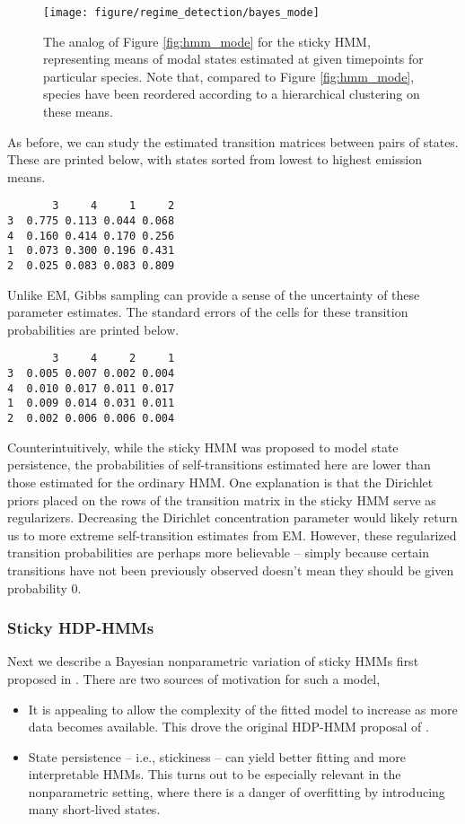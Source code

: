 \begin{figure}
  \centering
  \texttt{[image: figure/regime\_detection/bayes\_mode]}
  \caption{The analog of Figure \ref{fig:hmm_mode} for the sticky HMM,
    representing means of modal states estimated at given timepoints for
    particular species. Note that, compared to Figure \ref{fig:hmm_mode},
    species have been reordered according to a hierarchical clustering on these
    means. \label{fig:bayes_mode} }
\end{figure}

As before, we can study the estimated transition matrices between pairs of
states. These are printed below, with states sorted from lowest to highest
emission means.
\begin{verbatim}
       3     4     1     2
3  0.775 0.113 0.044 0.068
4  0.160 0.414 0.170 0.256
1  0.073 0.300 0.196 0.431
2  0.025 0.083 0.083 0.809
\end{verbatim}

Unlike EM, Gibbs sampling can provide a sense of the uncertainty of these
parameter estimates. The standard errors of the cells for these transition
probabilities are printed below.
\begin{verbatim}
       3     4     2     1
3  0.005 0.007 0.002 0.004
4  0.010 0.017 0.011 0.017
1  0.009 0.014 0.031 0.011
2  0.002 0.006 0.006 0.004
\end{verbatim}

Counterintuitively, while the sticky HMM was proposed to model state
persistence, the probabilities of self-transitions estimated here are lower than
those estimated for the ordinary HMM. One explanation is that the Dirichlet
priors placed on the rows of the transition matrix in the sticky HMM serve as
regularizers. Decreasing the Dirichlet concentration parameter would likely
return us to more extreme self-transition estimates from EM. However, these
regularized transition probabilities are perhaps more believable -- simply
because certain transitions have not been previously observed doesn't mean they
should be given probability 0.

\subsubsection{Sticky HDP-HMMs}
\label{sec:sticky_hdp_hmm}

Next we describe a Bayesian nonparametric variation of sticky HMMs first
proposed in \citep{fox2008hdp}. There are two sources of motivation for such a
model,
\begin{itemize}
\item It is appealing to allow the complexity of the fitted model to increase as
  more data becomes available. This drove the original HDP-HMM proposal of
  \citep{teh2006hierarchical}.
\item State persistence -- i.e., stickiness -- can yield better fitting and more
  interpretable HMMs. This turns out to be especially relevant in the
  nonparametric setting, where there is a danger of overfitting by introducing
  many short-lived states.
\end{itemize}

